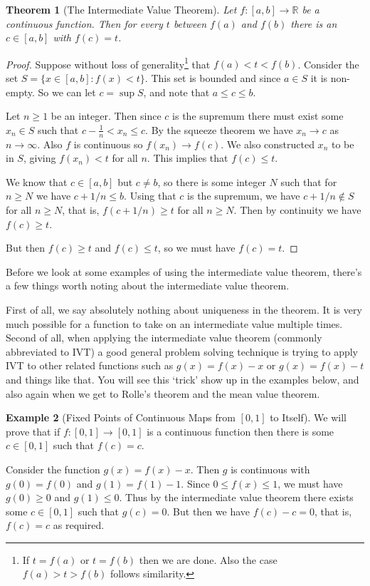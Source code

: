 \documentclass[11pt, a4paper]{article}
\newtheorem{theorem}{Theorem}[section]
\theoremstyle{definition}
\newtheorem{example}[theorem]{Example}
\newcommand{\R}{\mathbb{R}}
\begin{document}
\begin{theorem}[The Intermediate Value Theorem]
	Let $f: [a, b] \rightarrow \R$ be a continuous function. Then for every $t$ between $f(a)$ and $f(b)$ there is an $c \in [a, b]$ with $f(c) = t$.
\end{theorem}
\begin{proof}
Suppose without loss of generality\footnote{If $t = f(a)$ or $t = f(b)$ then we are done. Also the case $f(a)> t> f(b)$ follows similarity.} that $f(a) < t < f(b)$. Consider the set $S = \{x \in [a, b] : f(x) < t\}$. This set is bounded and since $a \in S$ it is non-empty. So we can let $c = \sup S$, and note that $a \leq c \leq b$.

Let $n \geq 1$ be an integer. Then since $c$ is the supremum there must exist some $x_n \in S$ such that $c - \frac{1}{n} < x_n \leq c$. 
By the squeeze theorem we have $x_n \rightarrow c$ as $n \rightarrow \infty$.
Also $f$ is continuous so $f(x_n) \rightarrow f(c)$. 
We also constructed $x_n$ to be in $S$, giving $f(x_n) < t$ for all $n$. This implies that $f(c) \leq t$. 

We know that $c \in [a, b]$ but $c \neq b$, so there is some integer $N$ such that for $n \geq N$ we have $c + 1/n \leq b$.
Using that $c$ is the supremum, we have $c + 1/n \not \in S$ for all $n \geq N$, that is, $f(c + 1/n) \geq t$ for all $n\geq N$.
Then by continuity we have $f(c) \geq t$. 

But then $f(c) \geq t$ and $f(c) \leq t$, so we must have $f(c) = t$.
\end{proof}

Before we look at some examples of using the intermediate value theorem, there's a few things worth noting about the intermediate value theorem.

First of all, we say absolutely nothing about uniqueness in the theorem. It is very much possible for a function to take on an intermediate value multiple times.
Second of all, when applying the intermediate value theorem (commonly abbreviated to IVT) a good general problem solving technique is trying to apply IVT to other related functions such as $g(x) = f(x) - x$ or $g(x) = f(x) - t$ and things like that. You will see this `trick' show up in the examples below, and also again when we get to Rolle's theorem and the mean value theorem.


\begin{example}[Fixed Points of Continuous Maps from ${[0,1]}$ to Itself]
	We will prove that if $f:[0, 1] \rightarrow [0, 1]$ is a continuous function then there is some $c \in [0, 1]$ such that $f(c)=c$.

	Consider the function $g(x) = f(x) - x$. Then $g$ is continuous with $g(0) = f(0)$ and $g(1) = f(1) - 1$. 
	Since $0 \leq f(x) \leq 1$, we must have $g(0) \geq 0$ and $g(1) \leq 0$. Thus by the intermediate value theorem there exists some $c \in [0, 1]$ such that $g(c) = 0$. But then we have $f(c) - c = 0$, that is, $f(c) = c$ as required.
\end{example}
\end{document}
